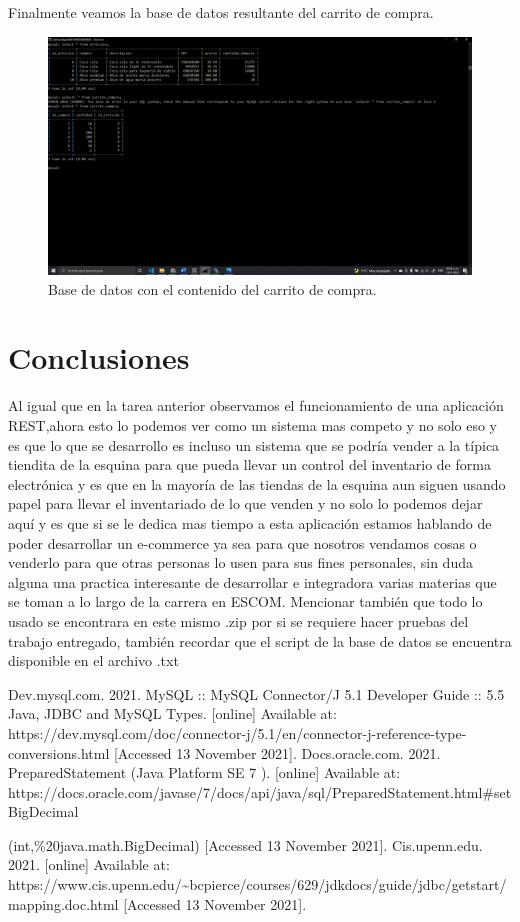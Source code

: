 \documentclass[11pt]{article}
\begin{document}
		Finalmente veamos la base de datos resultante del carrito de compra.
		\begin{figure}[H]
			\centering
			\includegraphics[scale=0.34]{resources/p4bd.png}
			\caption{Base de datos con el contenido del carrito de compra.}\label{fig:picture}
		\end{figure}	
		\section{Conclusiones}
	Al igual que en la tarea anterior observamos el funcionamiento de una aplicación REST,ahora esto lo podemos ver como un sistema mas competo y no solo eso y es que lo que se desarrollo es incluso un sistema que se podría vender a la típica tiendita de la esquina para que pueda llevar un control del inventario de forma electrónica y es que en la mayoría de las tiendas de la esquina aun siguen usando papel para llevar el inventariado de lo que venden y no solo lo podemos dejar aquí y es que si se le dedica mas tiempo a esta aplicación estamos hablando de poder desarrollar un e-commerce ya sea para que nosotros vendamos cosas o venderlo para que otras personas lo usen para sus fines personales, sin duda alguna una practica interesante de desarrollar e integradora varias materias que se toman a lo largo de la carrera en ESCOM. Mencionar también que todo lo usado se encontrara en este mismo .zip por si se requiere hacer pruebas del trabajo entregado, también recordar que el script de la base de datos se encuentra disponible en el archivo .txt
		\begin{thebibliography}{1}
  Dev.mysql.com. 2021. MySQL :: MySQL Connector/J 5.1 Developer Guide :: 5.5 Java, JDBC and MySQL Types. [online] Available at: https://dev.mysql.com/doc/connector-j/5.1/en/connector-j-reference-type-conversions.html [Accessed 13 November 2021].
   Docs.oracle.com. 2021. PreparedStatement (Java Platform SE 7 ). [online] Available at: https://docs.oracle.com/javase/7/docs/api/java/sql/PreparedStatement.html\#setBigDecimal\par(int,\%20java.math.BigDecimal) [Accessed 13 November 2021].
    Cis.upenn.edu. 2021. [online] Available at: https://www.cis.upenn.edu/\~{}bcpierce/courses/629/jdkdocs/guide/jdbc/getstart/mapping.doc.html [Accessed 13 November 2021].
     
\end{thebibliography}
\end{document}
